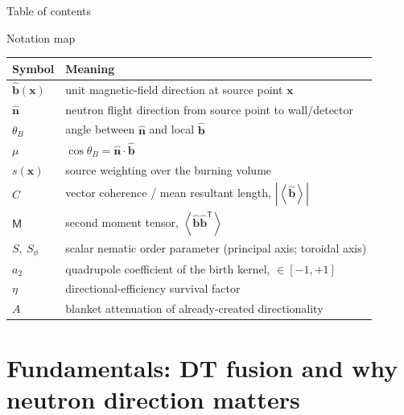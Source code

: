 \documentclass[aspectratio=169]{beamer}
\newcommand{\bn}{\hat{\bm n}}
\newcommand{\bb}{\hat{\bm b}}
\newcommand{\bx}{\bm x}
\newcommand{\T}{\mathsf T}
\newcommand{\avg}[1]{\left\langle #1 \right\rangle}
\newcommand{\M}{\mathsf M}
\newcommand{\Sphi}{S_\phi}
\begin{document}
\begin{frame}[t]{Table of contents}
\tableofcontents
\end{frame}

\begin{frame}[t]{Notation map}
\begin{tabular}{ll}
\toprule
Symbol & Meaning \\
\midrule
$\bb(\bx)$ & unit magnetic-field direction at source point $\bx$ \\
$\bn$ & neutron flight direction from source point to wall/detector \\
$\theta_B$ & angle between $\bn$ and local $\bb$ \\
$\mu$ & $\cos\theta_B = \bn\cdot\bb$ \\
$s(\bx)$ & source weighting over the burning volume \\
$C$ & vector coherence / mean resultant length, $|\avg{\bb}|$ \\
$\M$ & second moment tensor, $\avg{\bb\bb^\T}$ \\
$S,\ \Sphi$ & scalar nematic order parameter (principal axis; toroidal axis) \\
$a_2$ & quadrupole coefficient of the birth kernel, $\in[-1,+1]$ \\
$\eta$ & directional-efficiency survival factor \\
$A$ & blanket attenuation of already-created directionality \\
\bottomrule
\end{tabular}
\end{frame}

\section{Fundamentals: DT fusion and why neutron direction matters}
\end{document}
